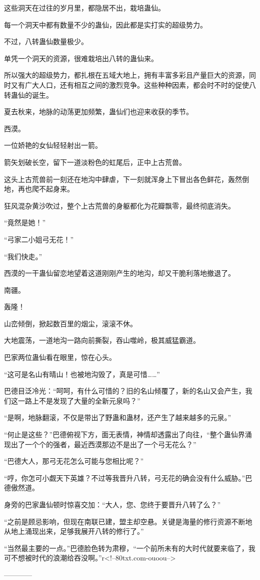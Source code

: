 \begin{this_body}
这些洞天在过往的岁月里，都隐居不出，栽培蛊仙。

每一个洞天中都有数量不少的蛊仙，因此都是实打实的超级势力。

不过，八转蛊仙数量极少。

单凭一个洞天的资源，很难栽培出八转的蛊仙来。

所以强大的超级势力，都扎根在五域大地上，拥有丰富多彩且产量巨大的资源，同时又有广大人口，还有相互之间的激烈竞争。这些种种因素，都会时不时的促使八转蛊仙的诞生。

夏去秋来，地脉的动荡更加频繁，蛊仙们也迎来收获的季节。

西漠。

一位娇艳的女仙轻轻射出一箭。

箭矢划破长空，留下一道淡粉色的虹尾后，正中上古荒兽。

这头上古荒兽前一刻还在地沟中肆虐，下一刻就浑身上下冒出各色鲜花，轰然倒地，再也爬不起身来。

狂风混杂黄沙吹过，整个上古荒兽的身躯都化为花瓣飘零，最终彻底消失。

“竟然是她！”

“弓家二小姐弓无花！”

“我们快走。”

西漠的一干蛊仙留恋地望着这道刚刚产生的地沟，却又干脆利落地撤退了。

南疆。

轰隆！

山峦倾倒，掀起数百里的烟尘，滚滚不休。

大地震荡，一道地沟一路向前撕裂，吞山噬岭，极其威猛霸道。

巴家两位蛊仙看在眼里，惊在心头。

“这可是名山有晴山！也被地沟毁了，真是可惜……”

巴德目泛冷光：“呵呵，有什么可惜的？旧的名山倾覆了，新的名山又会产生，我们这一路上不是发现了大量的全新元泉吗？”

“是啊，地脉翻滚，不仅是带出了野蛊和蛊材，还产生了越来越多的元泉。”

“何止是这些？”巴德俯视下方，面无表情，神情却透露出了向往，“整个蛊仙界涌现出了一个个的强者，最近西漠那边不是出了一个弓无花么？”

“巴德大人，那弓无花怎么可能与您相比呢？”

“哼，你怎可小觑天下英雄？不过等我晋升八转，弓无花的确会没有什么威胁。”巴德傲然道。

身旁的巴家蛊仙顿时惊喜交加：“大人，您、您终于要晋升八转了么？”

“之前是顾忌影响，但现在南联已建，盟主却空悬。关键是海量的修行资源不断地从地上涌现出来，足够我展开八转的修行了。”

“当然最主要的一点。”巴德脸色转为肃穆，“一个前所未有的大时代就要来临了，我可不想被时代的浪潮给吞没啊。”r<!--80txt.com-ouoou-->

------------

\end{this_body}

